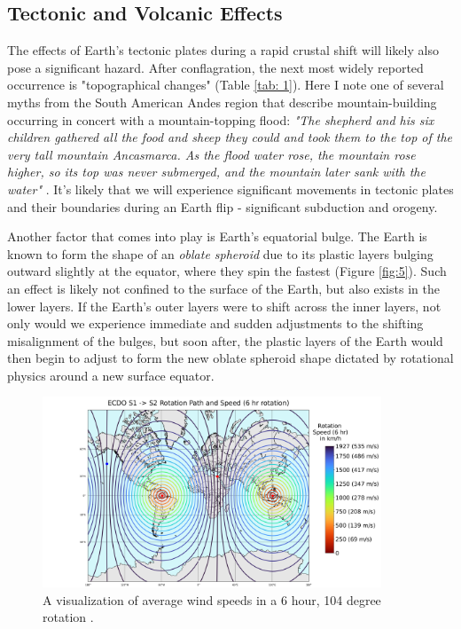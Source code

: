 \documentclass[10pt,twocolumn,letterpaper]{article}
\begin{document}
\subsection{Tectonic and Volcanic Effects}

The effects of Earth's tectonic plates during a rapid crustal shift will likely also pose a significant hazard. After conflagration, the next most widely reported occurrence is "topographical changes" (Table \ref{tab: 1}). Here I note one of several myths from the South American Andes region that describe mountain-building occurring in concert with a mountain-topping flood: \textit{"The shepherd and his six children gathered all the food and sheep they could and took them to the top of the very tall mountain Ancasmarca. As the flood water rose, the mountain rose higher, so its top was never submerged, and the mountain later sank with the water"} \cite{17}. It's likely that we will experience significant movements in tectonic plates and their boundaries during an Earth flip - significant subduction and orogeny.

Another factor that comes into play is Earth's equatorial bulge. The Earth is known to form the shape of an \textit{oblate spheroid} due to its plastic layers bulging outward slightly at the equator, where they spin the fastest (Figure \ref{fig:5}). Such an effect is likely not confined to the surface of the Earth, but also exists in the lower layers. If the Earth's outer layers were to shift across the inner layers, not only would we experience immediate and sudden adjustments to the shifting misalignment of the bulges, but soon after, the plastic layers of the Earth would then begin to adjust to form the new oblate spheroid shape dictated by rotational physics around a new surface equator.

\begin{figure}[t]
\begin{center}
\includegraphics[width=0.9\textwidth]{rotate2.png}
\end{center}
   \caption{A visualization of average wind speeds in a 6 hour, 104 degree rotation \cite{2}.}
   \label{fig:6}
\end{figure}
\end{document}
